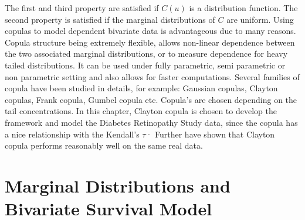 \documentclass[11pt]{article}
\theoremstyle{remboldstyle}
\begin{document}
The first and third property are satisfied if $C(u)$ is a distribution function. The second property is satisfied if the marginal distributions of $C$ are uniform. Using copulas to model dependent bivariate data is advantageous due to many reasons. Copula structure being extremely flexible, allows non-linear dependence between the two associated marginal distributions, or to measure dependence for heavy tailed distributions. It can be used under fully parametric, semi parametric or non parametric setting and also allows for faster computations. Several families of copula have been studied in details, for example: Gaussian copulas, Clayton copulas, Frank copula, Gumbel copula etc. Copula's are chosen depending on the tail concentrations. In this chapter, Clayton copula is chosen to develop the framework and model the Diabetes Retinopathy Study data, since the copula has a nice relationship with the Kendall's $\tau$· Further \cite{romeo:tanaka:2006} have shown that Clayton copula performs reasonably well on the same real data.
\section{Marginal Distributions and Bivariate Survival Model}
\label{sec:marg}
\end{document}
